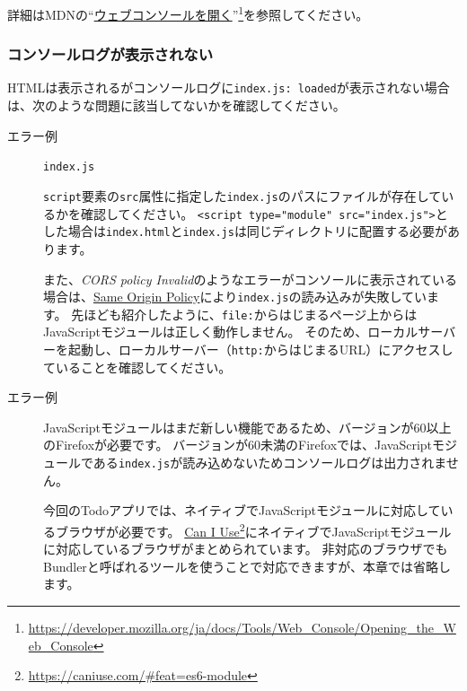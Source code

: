 詳細はMDNの``\href{https://developer.mozilla.org/ja/docs/Tools/Web_Console/Opening_the_Web_Console}{ウェブコンソールを開く}''\footnote{\url{https://developer.mozilla.org/ja/docs/Tools/Web_Console/Opening_the_Web_Console}}を参照してください。

\hypertarget{error-not-display-console-log}{%
\subsubsection{コンソールログが表示されない}\label{error-not-display-console-log}}

HTMLは表示されるがコンソールログに\texttt{index.js: loaded}が表示されない場合は、次のような問題に該当してないかを確認してください。

\begin{description}
\item[エラー例] \texttt{index.js}

\texttt{script}要素の\texttt{src}属性に指定した\texttt{index.js}のパスにファイルが存在しているかを確認してください。
\texttt{<script type="module" src="index.js">}とした場合は\texttt{index.html}と\texttt{index.js}は同じディレクトリに配置する必要があります。

また、\emph{CORS policy
Invalid}のようなエラーがコンソールに表示されている場合は、\href{https://developer.mozilla.org/ja/docs/Web/Security/Same-origin_policy}{Same
Origin
Policy}により\texttt{index.js}の読み込みが失敗しています。
先ほども紹介したように、\texttt{file:}からはじまるページ上からはJavaScriptモジュールは正しく動作しません。
そのため、ローカルサーバーを起動し、ローカルサーバー（\texttt{http:}からはじまるURL）にアクセスしていることを確認してください。

\item[エラー例] 

JavaScriptモジュールはまだ新しい機能であるため、バージョンが60以上のFirefoxが必要です。
バージョンが60未満のFirefoxでは、JavaScriptモジュールである\texttt{index.js}が読み込めないためコンソールログは出力されません。

今回のTodoアプリでは、ネイティブでJavaScriptモジュールに対応しているブラウザが必要です。
\href{https://caniuse.com/\#feat=es6-module}{Can I
Use}\footnote{\url{https://caniuse.com/\#feat=es6-module}}にネイティブでJavaScriptモジュールに対応しているブラウザがまとめられています。
非対応のブラウザでもBundlerと呼ばれるツールを使うことで対応できますが、本章では省略します。
\end{description}

